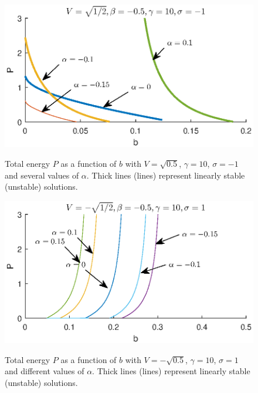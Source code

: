 \documentclass[aps,pre,showpacs,twocolumn]{revtex4}
\begin{document}
\begin{figure}[!htb]
\begin{center}
\scalebox{.7} {\includegraphics{branches_V05_sat10_ds-05_sigma-1.eps}}
\end{center}
\caption{Total energy $P$ as a function of $b$  with $V=\sqrt{0.5}$, $\gamma=10$, $\sigma=-1$ and several  values of $\alpha$. Thick lines (lines) represent linearly stable (unstable) solutions.}
\label{fig:branches_V05_sat10_ds-05_sigma-1}
\end{figure}

\begin{figure}[!htb]
\begin{center}
\scalebox{.7} {\includegraphics{branches_V-05_sat10_ds-05_sigma1.eps}}
\end{center}
\caption{Total energy $P$ as a function of $b$ with $V=-\sqrt{0.5}$, $\gamma=10$, $\sigma=1$ and different values of $\alpha$. Thick lines (lines) represent linearly stable (unstable) solutions.}
\label{fig:branches_V-05_sat10_ds-05_sigma1}
\end{figure}
\end{document}
